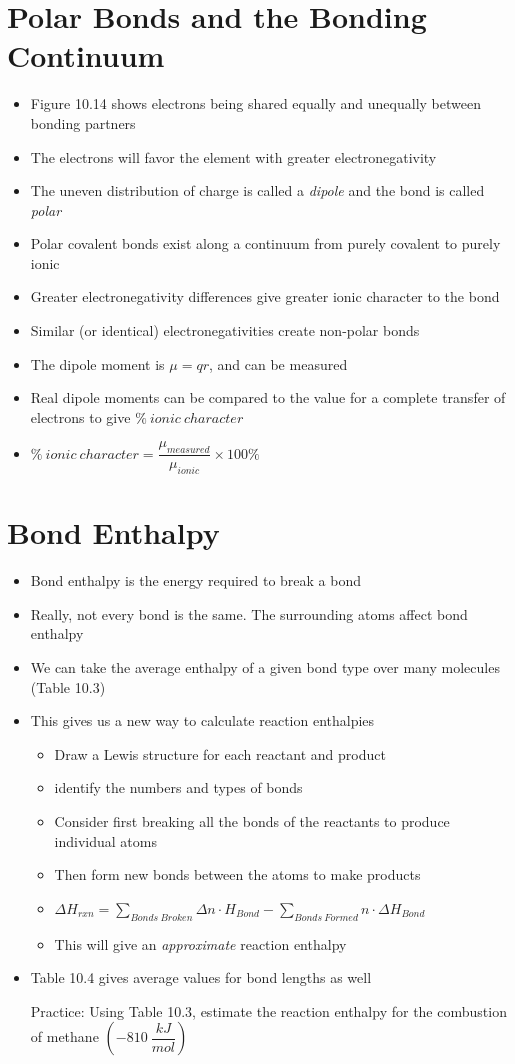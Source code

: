 \documentclass[12pt, openany, letterpaper]{memoir}
\begin{document}
\section{Polar Bonds and the Bonding Continuum}
\begin{itemize}
	\item Figure 10.14 shows electrons being shared equally and unequally between bonding partners
	\item The electrons will favor the element with greater electronegativity
	\item The uneven distribution of charge is called a \emph{dipole} and the bond is called \emph{polar}
	\item Polar covalent bonds exist along a continuum from purely covalent to purely ionic
	\item Greater electronegativity differences give greater ionic character to the bond
	\item Similar (or identical) electronegativities create non-polar bonds
	\item The dipole moment is $\mu=qr$, and can be measured
	\item Real dipole moments can be compared to the value for a complete transfer of electrons to give $\%~ionic~character$
	\item $\%~ionic~character=\dfrac{\mu_{measured}}{\mu_{ionic}}\times100\%$
\end{itemize}
\section{Bond Enthalpy}
\begin{itemize}
	\item Bond enthalpy is the energy required to break a bond
	\item Really, not every  bond is the same. The surrounding atoms affect bond enthalpy
	\item We can take the average enthalpy of a given bond type over many molecules (Table 10.3)
	\item This gives us a new way to calculate reaction enthalpies
	\begin{itemize}
		\item Draw a Lewis structure for each reactant and product
		\item identify the numbers and types of bonds
		\item Consider first breaking all the bonds of the reactants to produce individual atoms
		\item Then form new bonds between the atoms to make products
		\item $\Delta H_{rxn}=\sum\limits_{Bonds~Broken}\Delta n\cdot H_{Bond} - \sum\limits_{Bonds~Formed}n\cdot \Delta H_{Bond}$
		\item This will give an \emph{approximate} reaction enthalpy
	\end{itemize}
	\item Table 10.4 gives average values for bond lengths as well
	
	Practice: Using Table 10.3, estimate the reaction enthalpy for the combustion of methane $\left(-810~\dfrac{kJ}{mol}\right)$
\end{itemize}
\end{document}
